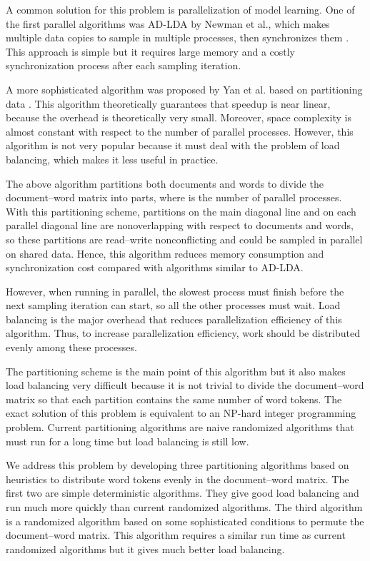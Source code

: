 \documentclass[10pt,conference]{IEEEtran}
\begin{document}
A common solution for this problem is parallelization of model learning. One of the first parallel algorithms was AD-LDA by Newman et al., which makes multiple data copies to sample in multiple processes, then synchronizes them \cite{newman2007distributed}. This approach is simple but it requires large memory and a costly synchronization process after each sampling iteration. 

A more sophisticated algorithm was proposed by Yan et al. based on partitioning data \cite{yan2009parallel}. This algorithm theoretically guarantees that speedup is near linear, because the overhead is theoretically very small. Moreover, space complexity is almost constant with respect to the number of parallel processes. However, this algorithm is not very popular because it must deal with the problem of load balancing, which makes it less useful in practice.

The above algorithm partitions both documents and words to divide the document--word matrix into  parts, where  is the number of parallel processes. With this partitioning scheme, partitions on the main diagonal line and on each parallel diagonal line are nonoverlapping with respect to documents and words, so these partitions are read--write nonconflicting and could be sampled in parallel on shared data. Hence, this algorithm reduces memory consumption and synchronization cost compared with algorithms similar to AD-LDA.

However, when running in parallel, the slowest process must finish before the next sampling iteration can start, so all the other processes must wait. Load balancing is the major overhead that reduces parallelization efficiency of this algorithm. Thus, to increase parallelization efficiency, work should be distributed evenly among these processes.

The partitioning scheme is the main point of this algorithm but it also makes load balancing very difficult because it is not trivial to divide the document--word matrix so that each partition contains the same number of word tokens. The exact solution of this problem is equivalent to an NP-hard integer programming problem. Current partitioning algorithms are naive randomized algorithms that must run for a long time but load balancing is still low.

We address this problem by developing three partitioning algorithms based on heuristics to distribute word tokens evenly in the document--word matrix. The first two are simple deterministic algorithms. They give good load balancing and run much more quickly than current randomized algorithms. The third algorithm is a randomized algorithm based on some sophisticated conditions to permute the document--word matrix. This algorithm requires a similar run time as current randomized algorithms but it gives much better load balancing.
\end{document}
